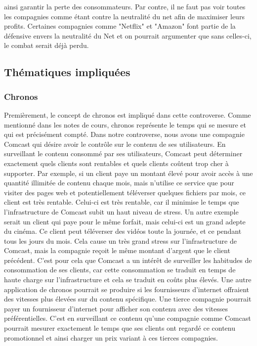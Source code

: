 \documentclass[12pt]{article}
\begin{document}
ainsi garantir la perte des consommateurs. Par contre, il ne faut pas voir toutes les compagnies comme étant contre la neutralité du net afin de maximiser leurs profits. Certaines compagnies comme "Netflix" et "Amazon" font partie de la défensive envers la neutralité du Net et on pourrait argumenter que sans celles-ci, le combat serait déjà perdu.

\subsection{Thématiques impliquées}
\subsubsection{Chronos}
Premièrement, le concept de chronos est impliqué dans cette controverse. Comme mentionné dans les notes de cours, chronos représente le temps qui se mesure et qui est précisément compté. Dans notre controverse, nous avons une compagnie Comcast qui désire avoir le contrôle sur le contenu de ses utilisateurs. En surveillant le contenu consommé par ses utilisateurs, Comcast peut déterminer exactement quels clients sont rentables et quels clients coûtent trop cher à supporter. Par exemple, si un client paye un montant élevé pour avoir accès à une quantité illimitée de contenu chaque mois, mais n’utilise ce service que pour visiter des pages web et potentiellement téléverser quelques fichiers par mois, ce client est très rentable. Celui-ci est très rentable, car il minimise le temps que l’infrastructure de Comcast subit un haut niveau de stress. Un autre exemple serait un client qui paye pour le même forfait, mais celui-ci est un grand adepte du cinéma. Ce client peut téléverser des vidéos toute la journée, et ce pendant tous les jours du mois. Cela cause un très grand stress sur l’infrastructure de Comcast, mais la compagnie reçoit le même montant d’argent que le client précédent. C’est pour cela que Comcast a un intérêt de surveiller les habitudes de consommation de ses clients, car cette consommation se traduit en temps de haute charge sur l’infrastructure et cela se traduit en coûts plus élevés. Une autre application de chronos pourrait se produire si les fournisseurs d’internet offraient des vitesses plus élevées sur du contenu spécifique. Une tierce compagnie pourrait payer un fournisseur d’internet pour afficher son contenu avec des vitesses préférentielles. C’est en surveillant ce contenu qu’une compagnie comme Comcast pourrait mesurer exactement le temps que ses clients ont regardé ce contenu promotionnel et ainsi charger un prix variant à ces tierces compagnies.
\end{document}
